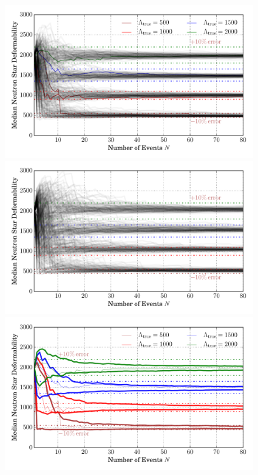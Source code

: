 \documentclass[aps,prd,amsmath,floats,floatfix, twocolumn,
superscriptaddress,nofootinbib,showpacs]{revtex4-1}
\begin{document}
\begin{figure}
\centering
\includegraphics[trim=1cm 0 0 0, width=1.025\columnwidth]{LambdaMedian_vs_N_AllPopulation}
\includegraphics[trim=0 0 1cm 0, width=1.025\columnwidth]{LambdaMedian_vs_N_AstroPopulation}\\
\includegraphics[trim=1cm 0 0 0, width=1.025\columnwidth]{LambdaMedian90pc_vs_N_AllPopulation}

\end{figure}
\end{document}

